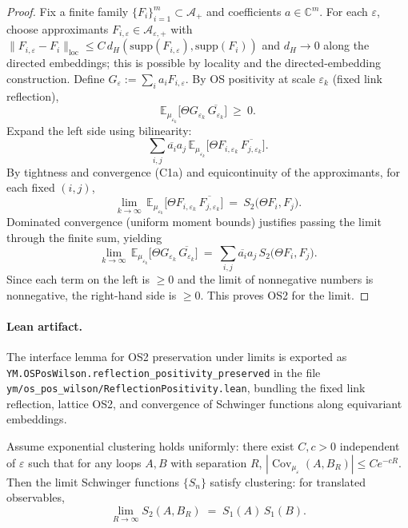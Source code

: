 \documentclass[11pt]{amsart}
\begin{document}
\begin{proof}[Proof]
Fix a finite family $\{F_i\}_{i=1}^m\subset\mathcal A_+$ and coefficients $a\in\mathbb C^m$. For each $\varepsilon$, choose approximants $F_{i,\varepsilon}\in\mathcal A_{\varepsilon,+}$ with $\|F_{i,\varepsilon}-F_i\|_{\mathrm{loc}}\le C\,d_H(\mathrm{supp}(F_{i,\varepsilon}),\mathrm{supp}(F_i))$ and $d_H\to 0$ along the directed embeddings; this is possible by locality and the directed-embedding construction. Define $G_{\varepsilon}:=\sum_i a_i F_{i,\varepsilon}$. By OS positivity at scale $\varepsilon_k$ (fixed link reflection),
\[
  \mathbb E_{\mu_{\varepsilon_k}}\bigl[\Theta G_{\varepsilon_k}\,\overline{G_{\varepsilon_k}}\bigr]\ \ge\ 0.
\]
Expand the left side using bilinearity:
\[
  \sum_{i,j} \overline{a_i} a_j\, \mathbb E_{\mu_{\varepsilon_k}}\bigl[\Theta F_{i,\varepsilon_k}\,\overline{F_{j,\varepsilon_k}}\bigr].
\]
By tightness and convergence (C1a) and equicontinuity of the approximants, for each fixed $(i,j)$,
\[
  \lim_{k\to\infty}\,\mathbb E_{\mu_{\varepsilon_k}}\bigl[\Theta F_{i,\varepsilon_k}\,\overline{F_{j,\varepsilon_k}}\bigr]
   \ =\ S_2\bigl(\Theta F_i, F_j\bigr).
\]
Dominated convergence (uniform moment bounds) justifies passing the limit through the finite sum, yielding
\[
  \lim_{k\to\infty}\,\mathbb E_{\mu_{\varepsilon_k}}\bigl[\Theta G_{\varepsilon_k}\,\overline{G_{\varepsilon_k}}\bigr]
   \ =\ \sum_{i,j} \overline{a_i} a_j\, S_2\bigl(\Theta F_i, F_j\bigr).
\]
Since each term on the left is $\ge 0$ and the limit of nonnegative numbers is nonnegative, the right-hand side is $\ge 0$. This proves OS2 for the limit.
\end{proof}

\paragraph{Lean artifact.}
The interface lemma for OS2 preservation under limits is exported as
\texttt{YM.OSPosWilson.reflection\_positivity\_preserved} in the file
\texttt{ym/os\_pos\_wilson/ReflectionPositivity.lean}, bundling the fixed link
reflection, lattice OS2, and convergence of Schwinger functions along
equivariant embeddings.

\begin{lemma}
Assume exponential clustering holds uniformly: there exist $C,c>0$ independent of $\varepsilon$ such that for any loops $A,B$ with separation $R$, $|\operatorname{Cov}_{\mu_\varepsilon}(A,B_R)|\le C e^{-cR}$. Then the limit Schwinger functions $\{S_n\}$ satisfy clustering: for translated observables,
\[
  \lim_{R\to\infty} S_2(A,B_R)\;=\;S_1(A)\,S_1(B).
\]
\end{lemma}
\end{document}
